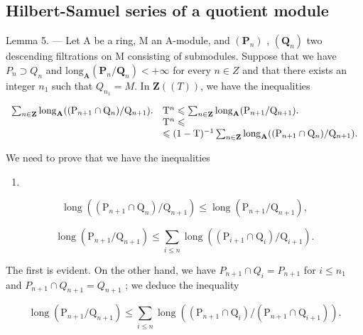 \subsection{Hilbert-Samuel series of a quotient module}

Lemma 5. — Let A be a ring, M an A-module, and \((\mathbf{P}_{n})\) , \((\mathbf{Q}_{n})\) two descending filtrations on M consisting of submodules. Suppose that we have \(P_{n} \supset Q_{n}\) and \(\text{long}_{\mathbf{A}}(\mathbf{P}_{n}/\mathbf{Q}_{n}) < +\infty\) for every \(n \in Z\) and that there exists an integer \(n_{1}\) such that \(Q_{n_{1}} = M\). In \(\mathbf{Z}((T))\), we have the inequalities

\[
\begin{array}{r l} \sum_ {n \in \mathbf {Z}} \mathrm{long} _ {\mathbf {A}} ((\mathrm{P} _ {n + 1} \cap \mathrm{Q} _ {n}) / \mathrm{Q} _ {n + 1}). & \mathrm{T} ^ {n} \leqslant \sum_ {n \in \mathbf {Z}} \mathrm{long} _ {\mathbf {A}} (\mathrm{P} _ {n + 1} / \mathrm{Q} _ {n + 1}). \\ & \mathrm{T} ^ {n} \leqslant \\ & \leqslant (1 - \mathrm{T}) ^ {- 1} \sum_ {n \in \mathbf {Z}} \mathrm{long} _ {\mathbf {A}} ((\mathrm{P} _ {n + 1} \cap \mathrm{Q} _ {n}) / \mathrm{Q} _ {n + 1}). \end{array}
\]

We need to prove that we have the inequalities

\begin{enumerate}
\def\labelenumi{(\arabic{enumi})}
\setcounter{enumi}{14}
\tightlist
\item
\end{enumerate}

\[
\operatorname{long} \left(\left(\mathrm{P} _ {n + 1} \cap \mathrm{Q} _ {n}\right) / \mathrm{Q} _ {n + 1}\right) \leqslant \operatorname{long} \left(\mathrm{P} _ {n + 1} / \mathrm{Q} _ {n + 1}\right),\tag{16}
\]

\[
\operatorname{long} \left(\mathrm{P} _ {n + 1} / \mathrm{Q} _ {n + 1}\right) \leqslant \sum_ {i \leqslant n} \operatorname{long} \left(\left(\mathrm{P} _ {i + 1} \cap \mathrm{Q} _ {i}\right) / \mathrm{Q} _ {i + 1}\right).
\]

The first is evident. On the other hand, we have \(P_{n+1} \cap Q_i = P_{n+1}\) for \(i \leqslant n_1\) and \(P_{n+1} \cap Q_{n+1} = Q_{n+1}\) ; we deduce the inequality

\[
\operatorname{long} \left(\mathrm{P} _ {n + 1} / \mathrm{Q} _ {n + 1}\right) \leqslant \sum_ {i \leqslant n} \operatorname{long} \left(\left(\mathrm{P} _ {n + 1} \cap \mathrm{Q} _ {i}\right) / \left(\mathrm{P} _ {n + 1} \cap \mathrm{Q} _ {i + 1}\right)\right).
\]

